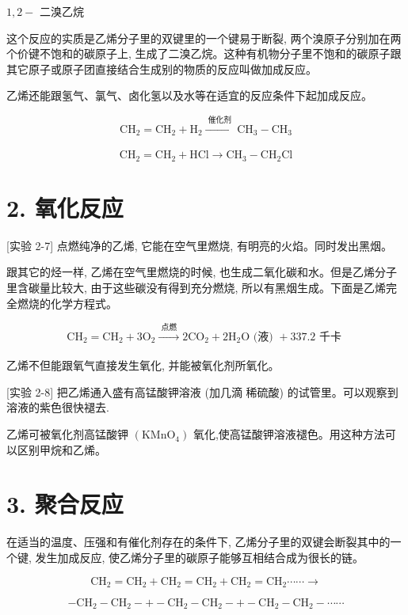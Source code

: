 \documentclass[10pt]{article}
\begin{document}
\(1,2 -\) 二溴乙烷

这个反应的实质是乙烯分子里的双键里的一个键易于断裂, 两个溴原子分别加在两个价键不饱和的碳原子上, 生成了二溴乙烷。这种有机物分子里不饱和的碳原子跟其它原子或原子团直接结合生成别的物质的反应叫做加成反应。

乙烯还能跟氢气、氯气、卤化氢以及水等在适宜的反应条件下起加成反应。

\[
{\mathrm{{CH}}}_{2} = {\mathrm{{CH}}}_{2} + {\mathrm{H}}_{2}\xrightarrow[]{\text{ 催化剂 }}{\mathrm{{CH}}}_{3} - {\mathrm{{CH}}}_{3}
\]

\[
{\mathrm{{CH}}}_{2} = {\mathrm{{CH}}}_{2} + \mathrm{{HCl}} \rightarrow {\mathrm{{CH}}}_{3} - {\mathrm{{CH}}}_{2}\mathrm{{Cl}}
\]

\section*{2. 氧化反应}

[实验 2-7] 点燃纯净的乙烯, 它能在空气里燃烧, 有明亮的火焰。同时发出黑烟。

跟其它的烃一样, 乙烯在空气里燃烧的时候, 也生成二氧化碳和水。但是乙烯分子里含碳量比较大, 由于这些碳没有得到充分燃烧, 所以有黑烟生成。下面是乙烯完全燃烧的化学方程式。

\[
{\mathrm{{CH}}}_{2} = {\mathrm{{CH}}}_{2} + 3{\mathrm{O}}_{2}\xrightarrow[]{\text{ 点燃 }}2{\mathrm{{CO}}}_{2} + 2{\mathrm{H}}_{2}\mathrm{O}\text{ (液) } + {337.2}\text{ 千卡 }
\]

乙烯不但能跟氧气直接发生氧化, 并能被氧化剂所氧化。

[实验 2-8] 把乙烯通入盛有高锰酸钾溶液 (加几滴 稀硫酸) 的试管里。可以观察到溶液的紫色很快褪去.

乙烯可被氧化剂高锰酸钾 \(\left( {\mathrm{{KMnO}}}_{4}\right)\) 氧化,使高锰酸钾溶液褪色。用这种方法可以区别甲烷和乙烯。

\section*{3. 聚合反应}

在适当的温度、压强和有催化剂存在的条件下, 乙烯分子里的双键会断裂其中的一个键, 发生加成反应, 使乙烯分子里的碳原子能够互相结合成为很长的链。

\[
{\mathrm{{CH}}}_{2} = {\mathrm{{CH}}}_{2} + {\mathrm{{CH}}}_{2} = {\mathrm{{CH}}}_{2} + {\mathrm{{CH}}}_{2} = {\mathrm{{CH}}}_{2}\cdots \cdots \rightarrow
\]

\[
- {\mathrm{{CH}}}_{2} - {\mathrm{{CH}}}_{2} - + - {\mathrm{{CH}}}_{2} - {\mathrm{{CH}}}_{2} - + - {\mathrm{{CH}}}_{2} - {\mathrm{{CH}}}_{2} - \cdots \cdots
\]
\end{document}
